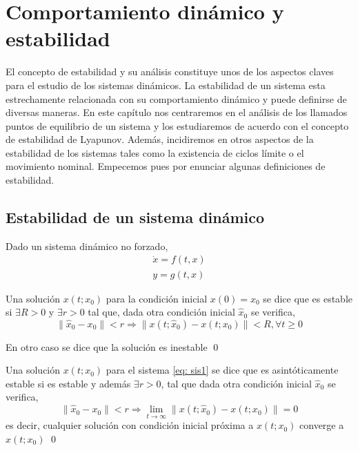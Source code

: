\chapter{Comportamiento dinámico y estabilidad}
El concepto de estabilidad y su análisis constituye unos de los aspectos claves para el estudio de los sistemas dinámicos. La estabilidad de un sistema esta estrechamente relacionada con su comportamiento dinámico y puede definirse de diversas maneras. En este capítulo nos centraremos en el análisis de los llamados puntos de equilibrio de un sistema y los estudiaremos de acuerdo con el concepto de estabilidad de Lyapunov. Además, incidiremos en otros aspectos de la estabilidad de los sistemas tales como la existencia de ciclos límite o el movimiento nominal. Empecemos pues por enunciar algunas definiciones de estabilidad.



\section{Estabilidad de un sistema dinámico}
Dado un sistema dinámico no forzado,
\begin{align}
\dot{x} = f(t,x) \label{eq: sis1}\\
y = g(t,x)
\end{align}

\begin{definition}\label{esttr}
Una solución $x(t;x_0)$ para la condición inicial $x(0) = x_0$ se dice que es estable si  $\exists R>0$ y  $ \exists r>0$ tal que, dada otra condición inicial $\hat x_0$ se verifica,
\begin{equation}
\|\hat x_0-x_0\|<r \Rightarrow \|x(t;\hat x_0) - x(t;x_0)\|<R, \forall t \geq 0
\end{equation}

En otro caso se dice que la solución es inestable 
\qed
\end{definition}

\begin{definition}
Una solución $x(t;x_0)$ para el sistema \ref{eq: sis1} se dice que es asintóticamente estable si es estable y además  $\exists r>0$, tal que dada otra condición inicial $\hat x_0$ se verifica,
\begin{equation}
\|\hat x_0-x_0\|<r \Rightarrow \lim_{t \to \infty}\|x(t;\hat x_0) - x(t;x_0)\|=0
\end{equation}
es decir, cualquier solución con condición inicial próxima  a $x(t;x_0)$ converge a $x(t;x_0)$
\qed
\end{definition}

